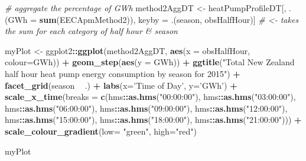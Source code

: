 \documentclass[]{article}
\newenvironment{Shaded}{\begin{snugshade}}{\end{snugshade}}
\newcommand{\KeywordTok}[1]{\textcolor[rgb]{0.13,0.29,0.53}{\textbf{#1}}}
\newcommand{\DataTypeTok}[1]{\textcolor[rgb]{0.13,0.29,0.53}{#1}}
\newcommand{\StringTok}[1]{\textcolor[rgb]{0.31,0.60,0.02}{#1}}
\newcommand{\CommentTok}[1]{\textcolor[rgb]{0.56,0.35,0.01}{\textit{#1}}}
\newcommand{\OperatorTok}[1]{\textcolor[rgb]{0.81,0.36,0.00}{\textbf{#1}}}
\newcommand{\NormalTok}[1]{#1}
\begin{document}
\begin{Shaded}
\begin{Highlighting}[]
\CommentTok{# aggregate the percentage of GWh}
\NormalTok{method2AggDT <-}\StringTok{ }\NormalTok{heatPumpProfileDT[, .(}\DataTypeTok{GWh =} \KeywordTok{sum}\NormalTok{(EECApmMethod2)), }
\NormalTok{                                  keyby =}\StringTok{ }\NormalTok{.(season, obsHalfHour)] }\CommentTok{# <- takes the sum for each category of half hour & season}

\NormalTok{myPlot <-}\StringTok{ }\NormalTok{ggplot2}\OperatorTok{::}\KeywordTok{ggplot}\NormalTok{(method2AggDT, }\KeywordTok{aes}\NormalTok{(}\DataTypeTok{x =}\NormalTok{ obsHalfHour, }\DataTypeTok{colour=}\NormalTok{GWh)) }\OperatorTok{+}
\StringTok{  }\KeywordTok{geom_step}\NormalTok{(}\KeywordTok{aes}\NormalTok{(}\DataTypeTok{y =}\NormalTok{ GWh)) }\OperatorTok{+}
\StringTok{  }\KeywordTok{ggtitle}\NormalTok{(}\StringTok{"Total New Zealand half hour heat pump energy consumption by season for 2015"}\NormalTok{) }\OperatorTok{+}
\StringTok{  }\KeywordTok{facet_grid}\NormalTok{(season }\OperatorTok{~}\StringTok{ }\NormalTok{.) }\OperatorTok{+}
\StringTok{  }\KeywordTok{labs}\NormalTok{(}\DataTypeTok{x=}\StringTok{'Time of Day'}\NormalTok{, }\DataTypeTok{y=}\StringTok{'GWh'}\NormalTok{) }\OperatorTok{+}
\StringTok{  }\KeywordTok{scale_x_time}\NormalTok{(}\DataTypeTok{breaks =} \KeywordTok{c}\NormalTok{(hms}\OperatorTok{::}\KeywordTok{as.hms}\NormalTok{(}\StringTok{"00:00:00"}\NormalTok{), hms}\OperatorTok{::}\KeywordTok{as.hms}\NormalTok{(}\StringTok{"03:00:00"}\NormalTok{), hms}\OperatorTok{::}\KeywordTok{as.hms}\NormalTok{(}\StringTok{"06:00:00"}\NormalTok{), hms}\OperatorTok{::}\KeywordTok{as.hms}\NormalTok{(}\StringTok{"09:00:00"}\NormalTok{), hms}\OperatorTok{::}\KeywordTok{as.hms}\NormalTok{(}\StringTok{"12:00:00"}\NormalTok{), }
\NormalTok{                          hms}\OperatorTok{::}\KeywordTok{as.hms}\NormalTok{(}\StringTok{"15:00:00"}\NormalTok{), hms}\OperatorTok{::}\KeywordTok{as.hms}\NormalTok{(}\StringTok{"18:00:00"}\NormalTok{), hms}\OperatorTok{::}\KeywordTok{as.hms}\NormalTok{(}\StringTok{"21:00:00"}\NormalTok{))) }\OperatorTok{+}
\KeywordTok{scale_colour_gradient}\NormalTok{(}\DataTypeTok{low=} \StringTok{"green"}\NormalTok{, }\DataTypeTok{high=}\StringTok{"red"}\NormalTok{)}

\NormalTok{myPlot}
\end{Highlighting}
\end{Shaded}
\end{document}
